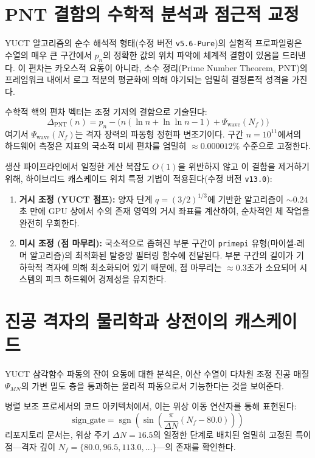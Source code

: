 \documentclass[11pt,a4paper]{article}
\begin{document}
	\section{PNT 결함의 수학적 분석과 점근적 교정}
	YUCT 알고리즘의 순수 해석적 형태(수정 버전 \texttt{v5.6-Pure})의 실험적 프로파일링은 수열의 매우 큰 구간에서 $p_n$의 정확한 값의 위치 파악에 체계적 결함이 있음을 드러낸다. 이 편차는 카오스적 요동이 아니라, 소수 정리(Prime Number Theorem, PNT)의 프레임워크 내에서 로그 적분의 평균화에 의해 야기되는 엄밀히 결정론적 성격을 가진다.
	
	수학적 핵의 편차 벡터는 조정 기저의 결함으로 기술된다:
	\begin{equation}
		\Delta_{\mathrm{PNT}}(n) = p_n - \bigl( n(\ln n + \ln\ln n - 1) + \Psi_{\mathrm{wave}}(N_f) \bigr)
	\end{equation}
	여기서 $\Psi_{\mathrm{wave}}(N_f)$는 격자 장력의 파동형 정현파 변조기이다. 구간 $n = 10^{11}$에서의 하드웨어 측정은 지표의 국소적 미세 편차를 엄밀히 $\approx 0.000012\%$ 수준으로 고정한다.
	
	생산 파이프라인에서 일정한 계산 복잡도 $O(1)$을 위반하지 않고 이 결함을 제거하기 위해, 하이브리드 캐스케이드 위치 특정 기법이 적용된다(수정 버전 \texttt{v13.0}):
	\begin{enumerate}
		\item \textbf{거시 조정 (YUCT 점프):} 양자 단계 $q = (3/2)^{1/3}$에 기반한 알고리즘이 $\sim 0.24$초 만에 GPU 상에서 수의 존재 영역의 거시 좌표를 계산하여, 순차적인 체 작업을 완전히 우회한다.
		\item \textbf{미시 조정 (점 마무리):} 국소적으로 좁혀진 부분 구간이 \texttt{primepi} 유형(마이셀-레머 알고리즘)의 최적화된 탈중앙 필터링 함수에 전달된다. 부분 구간의 길이가 기하학적 격자에 의해 최소화되어 있기 때문에, 점 마무리는 $\approx 0.3$초가 소요되며 시스템의 피크 하드웨어 경제성을 유지한다.
	\end{enumerate}
	
	\section{진공 격자의 물리학과 상전이의 캐스케이드}
	YUCT 삼각함수 파동의 잔여 요동에 대한 분석은, 이산 수열이 다차원 조정 진공 매질 $\Psi_{MN}$의 가변 밀도 층을 통과하는 물리적 파동으로서 기능한다는 것을 보여준다.
	
	병렬 보조 프로세서의 코드 아키텍처에서, 이는 위상 이동 연산자를 통해 표현된다:
	\begin{equation}
		\mathrm{sign\_gate} = \operatorname{sgn}\!\left(\sin\!\left(\frac{\pi}{\Delta N} (N_f - 80.0)\right)\right)
	\end{equation}
	리포지토리 문서는, 위상 주기 $\Delta N = 16.5$의 일정한 단계로 배치된 엄밀히 고정된 특이점—격자 깊이 $N_f = \{80.0, 96.5, 113.0, \dots\}$—의 존재를 확인한다.
	
\end{document}

